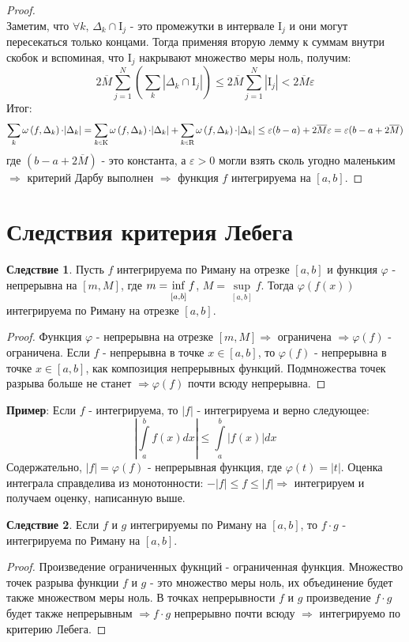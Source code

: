 \documentclass[12pt]{article}
\newcommand{\MI}{\mathrm{I}}
\newcommand{\VE}{\varepsilon}
\theoremstyle{definition}
\newtheorem{corollary}{Следствие}
\newcommand{\ddint}[2]{\displaystyle\int\limits_{#1}^{#2}}
\newcommand{\smallerrel}[1]{\mathrel{\mathpalette\smallerrelaux{#1}}}
\newcommand{\smallerrelaux}[2]{\raisebox{.1ex}{\scalebox{.75}{$#1#2$}}}
\newcommand{\smallin}{\smallerrel{\in}}
\newcommand{\newinf}{\mathop{\mathrm{inf}\vphantom{\mathrm{sup}}}}
\begin{document}
\begin{proof}
$$	$$
	Заметим, что $\forall k, \, \Delta_k \cap \MI_j$ - это промежутки в интервале $\MI_j$ и они могут пересекаться только концами. Тогда применяя вторую лемму к суммам внутри скобок и вспоминая, что $\MI_j$ накрывают множество меры ноль, получим:
	$$
		2 \overline{M} \sum\limits_{j = 1}^N\left(\sum\limits_{k} |\Delta_k \cap \MI_j|\right) \leq 2 \overline{M} \sum\limits_{j = 1}^N |\MI_j| < 2\overline{M} \VE
	$$
	Итог: 
	$$
		\sum\limits_{k}\omega\left(f, \Delta_k\right){\cdot}|\Delta_k| = \sum\limits_{k \smallin \mathrm{K}}\omega\left(f, \Delta_k\right){\cdot}|\Delta_k| + \sum\limits_{k \smallin \mathrm{R}}\omega\left(f, \Delta_k\right){\cdot}|\Delta_k| \leq \VE(b-a) + 2\overline{M}\VE = \VE(b-a + 2\overline{M})
	$$	
	где $(b-a + 2\overline{M})$ - это константа, а $\VE > 0$ могли взять сколь угодно маленьким $\Rightarrow$ критерий Дарбу выполнен $\Rightarrow$ функция $f$ интегрируема на $[a,b]$.
\end{proof}

\section*{Следствия критерия Лебега}
\begin{corollary}
	Пусть $f$ интегрируема по Риману на отрезке $[a,b]$ и функция $\varphi$ - непрерывна на $[m,M]$, где $m = \newinf\limits_{[a,b]}f$, $M = \sup\limits_{[a,b]}f$. Тогда $\varphi\left(f(x)\right)$ интегрируема по Риману на отрезке $[a,b]$.
\end{corollary}
\begin{proof}
	Функция $\varphi$ - непрерывна на отрезке $[m,M] \Rightarrow$ ограничена $\Rightarrow \varphi(f)$ - ограничена. Если $f$ - непрерывна в точке $x \in [a,b]$, то $\varphi\left(f\right)$ - непрерывна в точке $x \in [a,b]$, как композиция непрерывных функций. Подмножества точек разрыва больше не станет $\Rightarrow \varphi(f)$ почти всюду непрерывна.
\end{proof}
\textbf{Пример}: Если $f$ - интегрируема, то $|f|$ - интегрируема и верно следующее:
$$
	\left| \ddint{a}{b}f(x)dx \right| \leq \ddint{a}{b}|f(x)|dx
$$
Содержательно, $|f| = \varphi(f)$ - непрерывная функция, где $\varphi(t) = |t|$. Оценка интеграла справделива из монотонности: $-|f| \leq f \leq |f| \Rightarrow$ интегрируем и получаем оценку, написанную выше.

\begin{corollary}
	Если $f$ и $g$ интегрируемы по Риману на $[a,b]$, то $f{\cdot}g$ - интегрируема по Риману на $[a,b]$.
\end{corollary}
\begin{proof}
	Произведение ограниченных фукнций - ограниченная функция. Множество точек разрыва функции $f$ и $g$ - это множество меры ноль, их объединение будет также множеством меры ноль. В точках непрерывности $f$ и $g$ произведение $f{\cdot}g$ будет также непрерывным $\Rightarrow f{\cdot}g$ непрерывно почти всюду $\Rightarrow$ интегрируемо по критерию Лебега.
\end{proof}
\end{document}
